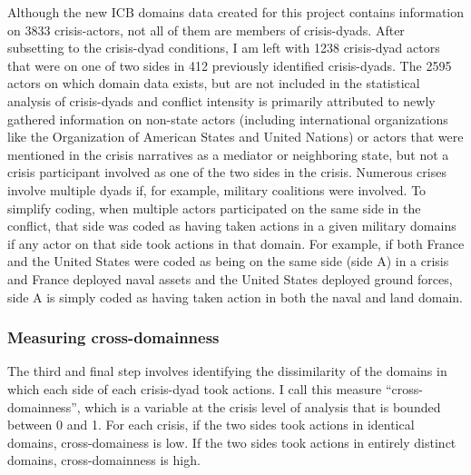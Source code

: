 \documentclass[
]{article}
\begin{document}
Although the new ICB domains data created for this project contains information on 3833 crisis-actors, not all of them are members of crisis-dyads. After subsetting to the crisis-dyad conditions, I am left with 1238 crisis-dyad actors that were on one of two sides in 412 previously identified crisis-dyads. The 2595 actors on which domain data exists, but are not included in the statistical analysis of crisis-dyads and conflict intensity is primarily attributed to newly gathered information on non-state actors (including international organizations like the Organization of American States and United Nations) or actors that were mentioned in the crisis narratives as a mediator or neighboring state, but not a crisis participant involved as one of the two sides in the crisis. Numerous crises involve multiple dyads if, for example, military coalitions were involved. To simplify coding, when multiple actors participated on the same side in the conflict, that side was coded as having taken actions in a given military domains if any actor on that side took actions in that domain. For example, if both France and the United States were coded as being on the same side (side A) in a crisis and France deployed naval assets and the United States deployed ground forces, side A is simply coded as having taken action in both the naval and land domain.

\hypertarget{measuring-cross-domainness}{%
\subsubsection{Measuring cross-domainness}\label{measuring-cross-domainness}}

The third and final step involves identifying the dissimilarity of the domains in which each side of each crisis-dyad took actions. I call this measure ``cross-domainness'', which is a variable at the crisis level of analysis that is bounded between 0 and 1. For each crisis, if the two sides took actions in identical domains, cross-domainess is low. If the two sides took actions in entirely distinct domains, cross-domainness is high.
\end{document}

